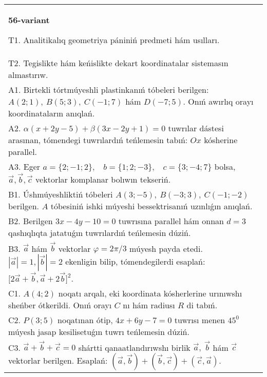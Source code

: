 \documentclass{article}
\begin{document}
    
    \begin{tabular}{m{17cm}}
    \textbf{56-variant}
    \newline
    
    T1. Analitikalıq geometriya pániniń predmeti hám usılları. 
     \\
    T2. Tegislikte hám keńislikte dekart koordinatalar sistemasın almastırıw. 
     \\
    A1. 
    Birtekli tórtmúyeshli plastinkanıń tóbeleri berilgen:
    $A(2;1), \ B(5;3), \ C(-1;7)$ hám $D(-7;5)$. Onıń awırlıq orayı
    koordinataların anıqlań.
     \\
    A2. 
    $\alpha(x+2y-5)+\beta(3x-2y+1)=0$ tuwrılar
    dástesi arasınan, tómendegi tuwrılardıń teńlemesin tabıń:
    $Ox$ kósherine parallel.
     \\
    A3. 
    Eger \(a = \{ 2; - 1;2\},\ \ \ \ b = \{ 1;2; - 3\},\ \ \ \ c = \{ 3; - 4;7\}\) bolsa, $\overrightarrow{a}, \overrightarrow{b}, \overrightarrow{c}$ vektorlar komplanar bolıwın tekseriń. \\
    B1. 
    Úshmúyeshliktiń tóbeleri
    \(A(3;-5),\ B(-3;3),\ C(-1;-2)\) berilgen. $A$ tóbesiniń ishki
    múyeshi bessektrisanıń uzınlıǵın anıqlań.
     \\
    B2. 
    Berilgen \(3x-4y-10=0\) tuwrısına parallel hám onnan
    $d=3$ qashıqlıqta jatatuǵın tuwrılardıń teńlemesin dúziń.
     \\
    B3. 
    $\vec{a}$ hám $\vec{b}$ vektorlar $\varphi = 2\pi/3$ múyesh payda etedi. $|\vec{a}| = 1,|\vec{b}| = 2$ ekenligin bilip, tómendegilerdi esaplań: 
    $\lbrack 2\overrightarrow{a} + \overrightarrow{b},\overrightarrow{a} + 2\overrightarrow{b}\rbrack^{2}$.
     \\
    C1. \(A(4;2)\) noqatı arqalı, eki koordinata kósherlerine
    urınıwshı sheńber ótkerildi. Onıń orayı $C$ nı hám radiusı
    $R$ di tabıń.
     \\
    C2. 
    \(P(3;5)\) noqatınan ótip, \(4x + 6y - 7 = 0\) tuwrısı
    menen \(45^{0}\) múyesh jasap kesilisetuǵın tuwrı teńlemesin dúziń.
     \\
    C3. \(\vec{a} + \vec{b} + \vec{c} = 0\) shártti qanaatlandırıwshı birlik \(\vec{a},\ \vec{b}\) hám \(\vec{c}\) vektorlar berilgen. Esaplań: \(\left(\vec{a},\vec{b} \right) + \left(\vec{b},\vec{c} \right) + \left(\vec{c},\vec{a} \right) \).
     \\
    
    \end{tabular}
    \vspace{1cm}
    
\end{document}
